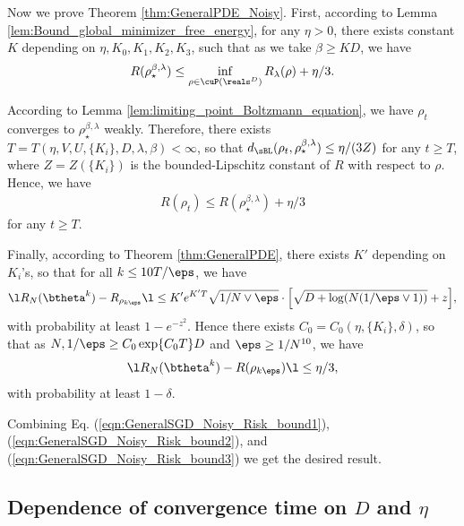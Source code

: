 \documentclass[11pt]{article}
\begin{document}
Now we prove Theorem \ref{thm:GeneralPDE_Noisy}. First, according to Lemma \ref{lem:Bound_global_minimizer_free_energy}, for any $\eta > 0$, there exists constant $K$ depending on $\eta, K_0, K_1, K_2, K_3$, such that as we take $\beta \ge K D$, we have
\begin{align}\label{eqn:GeneralSGD_Noisy_Risk_bound1}
R(\rho_\star^{\beta, \lambda}) \le \inf_{\rho \in \cuP(\reals^D)} R_\lambda(\rho) + \eta/3. 
\end{align} 

According to Lemma \ref{lem:limiting_point_Boltzmann_equation}, we have $\rho_t$ converges to $\rho_\star^{\beta, \lambda}$ weakly. Therefore, there exists $T = T(\eta,V,U,\{K_i\},D,\lambda, \beta) < \infty$, so that $d_{\sBL}(\rho_t, \rho_\star^{\beta, \lambda}) \le \eta/(3Z)$ for any $t \ge T$, where $Z = Z(\{K_i\})$ is the bounded-Lipschitz constant of $R$ with respect to $\rho$. Hence, we have 
\begin{align}\label{eqn:GeneralSGD_Noisy_Risk_bound2}
R(\rho_t) \le R(\rho_\star^{\beta, \lambda}) + \eta/3
\end{align}
for any $t \ge T$. 

Finally, according to Theorem \ref{thm:GeneralPDE}, there exists $K'$ depending on $K_i$'s, so that for all $k \le 10 T / \eps$, we have
\[
\l R_{N}(\btheta^k) - R_{\rho_{k \eps}} \l \le K' e^{K' T}\sqrt{1/N \vee \eps } \cdot \Big[\sqrt{D + \log (N  (1 / \eps \vee 1))} + z \Big],
\]
with probability at least $1 - e^{-z^2}$. Hence there exists $C_0 = C_0(\eta, \{K_i\}, \delta)$, so that as $N, 1/\eps \ge C_0 \exp\{ C_0 T \} D$ and $\eps \ge 1/N^{10}$, we have 
\begin{align}\label{eqn:GeneralSGD_Noisy_Risk_bound3}
\l R_{N}(\btheta^k) - R(\rho_{k \eps}) \l \le \eta/3,
\end{align}
with probability at least $1 - \delta$. 

Combining Eq. (\ref{eqn:GeneralSGD_Noisy_Risk_bound1}), (\ref{eqn:GeneralSGD_Noisy_Risk_bound2}), and (\ref{eqn:GeneralSGD_Noisy_Risk_bound3}) we get the desired result. 


\subsection{Dependence of convergence time on $D$ and $\eta$}
\end{document}
